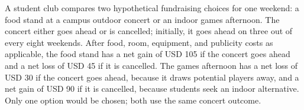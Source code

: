 \begingroup
\clearpage
{}
\vspace{-2mm}
A student club compares two hypothetical fundraising choices for one weekend: a food
stand at a campus outdoor concert or an indoor games afternoon. The concert either goes
ahead or is cancelled; initially, it goes ahead on three out of every eight weekends.
After food, room, equipment, and publicity costs as applicable, the food stand has a net
gain of USD 105 if the concert goes ahead and a net loss of USD 45 if it is cancelled.
The games afternoon has a net loss of USD 30 if the concert goes ahead, because it draws
potential players away, and a net gain of USD 90 if it is cancelled, because students
seek an indoor alternative. Only one option would be chosen; both use the same concert outcome.

